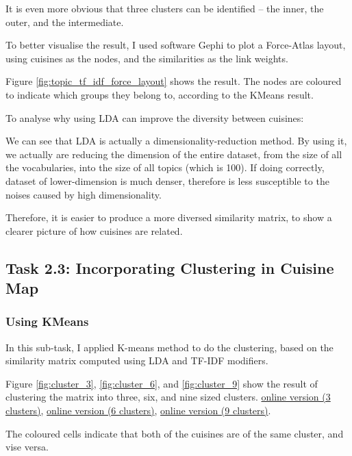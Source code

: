 \documentclass[11pt]{article}
\begin{document}
It is even more obvious that three clusters can be identified -- the inner, the outer, and the intermediate.
\vspace{1em}

To better visualise the result, I used software Gephi to plot a Force-Atlas layout, using cuisines as the nodes, and the similarities as the link weights.

Figure \ref{fig:topic_tf_idf_force_layout} shows the result. The nodes are coloured to indicate which groups they belong to, according to the KMeans result.

\vspace{1em}

To analyse why using LDA can improve the diversity between cuisines:

We can see that LDA is actually a dimensionality-reduction method.
By using it, we actually are reducing the dimension of the entire dataset, from the size of all the vocabularies, into the size of all topics (which is 100).
If doing correctly, dataset of lower-dimension is much denser, therefore is less susceptible to the noises caused by high dimensionality.

Therefore, it is easier to produce a more diversed similarity matrix, to show a clearer picture of how cuisines are related.


\subsection{Task 2.3: Incorporating Clustering in Cuisine Map}
\subsubsection{Using KMeans}

In this sub-task, I applied K-means method to do the clustering, based on the similarity matrix computed using LDA and TF-IDF modifiers.

\vspace{1em}
Figure \ref{fig:cluster_3}, \ref{fig:cluster_6}, and \ref{fig:cluster_9} show the result of clustering the matrix into three, six, and nine sized clusters.
\href{http://jiacheng-pan.me/standalone/datamining_capstone/task2/cluster_3.html}{online version (3 clusters)},
\href{http://jiacheng-pan.me/standalone/datamining_capstone/task2/cluster_6.html}{online version (6 clusters)},
\href{http://jiacheng-pan.me/standalone/datamining_capstone/task2/cluster_9.html}{online version (9 clusters)}.

The coloured cells indicate that both of the cuisines are of the same cluster, and vise versa.
\end{document}
